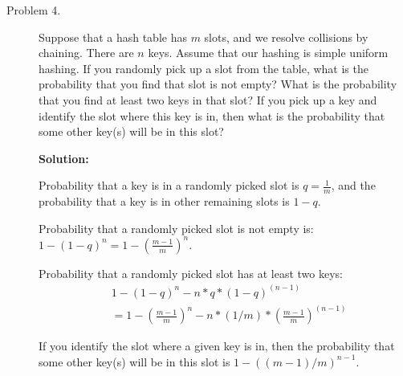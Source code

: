 \documentclass[11pt]{article}
\begin{document}
\begin{description}
\item[Problem 4.]
Suppose that a hash table has $m$ slots, and we resolve collisions by chaining.
There are $n$ keys. Assume that our hashing is simple uniform hashing. If you
randomly pick up a slot from the table, what is the probability that you find
that slot is not empty? What is the probability that you find at least two keys
in that slot? If you pick up a key and identify the slot where this key is in,
then what is the probability that some other key(s) will be in this slot?

\noindent \textbf{Solution:}

Probability that a key is in a randomly picked slot is $q=\frac{1}{m}$, and the
probability that a key is in other remaining slots is $1-q$.

Probability that a randomly picked slot is not empty is:
$1-(1-q)^n=1-(\frac{m-1}{m})^n$.

Probability that a randomly picked slot has at least two keys:
\begin{eqnarray}
&1-(1-q)^n-n*q*(1-q)^{(n-1)} \nonumber \\
&=1-(\frac{m-1}{m})^n- n*(1/m)*(\frac{m-1}{m})^{(n-1)} \nonumber
\end{eqnarray}

If you identify the slot where a given key is in, then the probability that
some other key(s) will be in this slot is $1-((m-1)/m)^{n-1}$.
\end{description}
\end{document}
